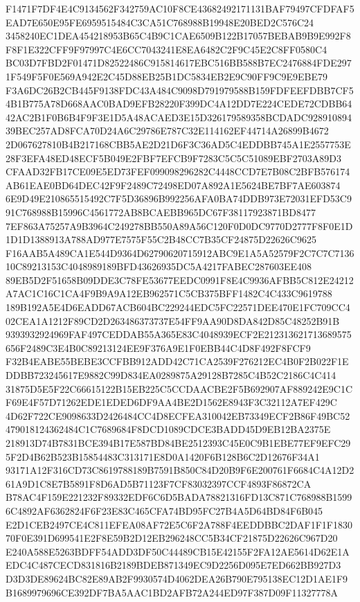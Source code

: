 \documentclass[UTF8,fontset=fandol,zihao=-4,a4paper]{ctexart}
\begin{document}
{{F1471F7DF4E4C9134562F342759AC10F8CE43682492171131BAF79497CFDFAF5EAD7E650E95FE6959515484C3CA51C768988B19948E20BED2C576C24
3458240EC1DEA454218953B65C4B9C1CAE6509B122B17057BEBAB9B9E992F8F8F1E322CFF9F97997C4E6CC7043241E8EA6482C2F9C45E2C8FF0580C4
BC03D7FBD2F01471D82522486C915814617EBC516BB588B7EC2476884FDE2971F549F5F0E569A942E2C45D88EB25B1DC5834EB2E9C90FF9C9E9EBE79
F3A6DC26B2CB445F9138FDC43A484C9098D791979588B159FDFEEFDBB7CF54B1B775A78D668AAC0BAD9EFB28220F399DC4A12DD7E224CEDE72CDBB64
42AC2B1F0B6B4F9F3E1D5A48ACAED3E15D326179589358BCDADC92891089439BEC257AD8FCA70D24A6C29786E787C32E114162EF44714A26899B4672
2D067627810B4B217168CBB5AE2D21D6F3C36AD5C4EDDBB745A1E2557753E28F3EFA48ED48ECF5B049E2FBF7EFCB9F7283C5C5C51089EBF2703A89D3
CFAAD32FB17CE09E5ED73FEF099098296282C4448CCD7E7B08C2BFB576174AB61EAE0BD64DEC42F9F2489C72498ED07A892A1E5624BE7BF7AE603874
6E9D49E210865515492C7F5D36896B992256AFA0BA74DDB973E72031EFD53C991C768988B15996C4561772AB8BCAEBB965DC67F38117923871BD8477
7EF863A75257A9B3964C249278BB550A89A56C120F0D0DC9770D2777F8F0E1D1D1D1388913A788AD977E7575F55C2B48CC7B35CF24875D22626C9625
F16AAB5A489CA1E544D9364D62790620715912ABC9E1A5A52579F2C7C7C713610C89213153C4048989189BFD43626935DC5A4217FABEC287603EE408
89EB5D2F51658B09DDE3C78FE53677EEDC0991F8E4C9936AFBB5C812E24212A7AC1C16C1CA4F9B9A9A12EB962571C5CB375BFF1482C4C433C9619788
189B192A5E4D6EADD67ACB604BC229244EDC5FC22571DEE470E1FC709CC402CEA1A1212F89CD2D263486373737E54FF9AA90D8DA842D85C48252B91B
9393932924969FAF497CEDDAB55A365E83C4048939ECF2E212313621713689575656F2489C3E4B0C89213124EE9F376A9E1F0EBB44C4D8F492F8FCF9
F32B4EABE55BEBE3CCFBB912ADD42C71CA2539F276212EC4B0F2B022F1EDDBB723245617E9882C99D834EA0289875A29128B7285C4B52C2186C4C414
31875D5E5F22C66615122B15EB225C5CCDAACBE2F5B692907AF889242E9C1CF69E4F57D71262EDE1EDED6DF9AA4BE2D1562E8943F3C32112A7EF429C
4D62F722CE9098633D2426484CC4D8ECFEA310042EB73349ECF2B86F49BC52479018124362484C1C7689684F8DCD1089CDCE3BADD45D9EB12BA2375E
218913D74B7831BCE394B17E587BD84BE2512393C45E0C9B1EBE77EF9EFC295F2D4B62B523B15854483C313171E8D0A1420F6B128B6C2D12676F34A1
93171A12F316CD73C8619788189B7591B850C84D20B9F6E200761F6684C4A12D261A9D1C8E7B5891F8D6AD5B71123F7CF83032397CCF4893F86872CA
B78AC4F159E221232F89332EDF6C6D5BADA78821316FD13C871C768988B15996C4892AF6362824F6F23E83C465CFA74BD95FC27B4A5D64BD84F6B045
E2D1CEB2497CE4C811EFEA08AF72E5C6F2A788F4EEDDBBC2DAF1F1F183070F0E391D699541E2F8E59B2D12EB296248CC5B34CF21875D22626C967D20
E240A588E5263BDFF54ADD3DF50C44489CB15E42155F2FA12AE5614D62E1AEDC4C487CECD831816B2189BDEB871349EC9D2256D095E7ED662BB927D3
D3D3DE89624BC82E89AB2F9930574D4062DEA26B790E795138EC12D1AE1F9B1689979696CE392DF7BA5AAC1BD2AFB72A244ED97F387D09F11327778A
}}
\end{document}
